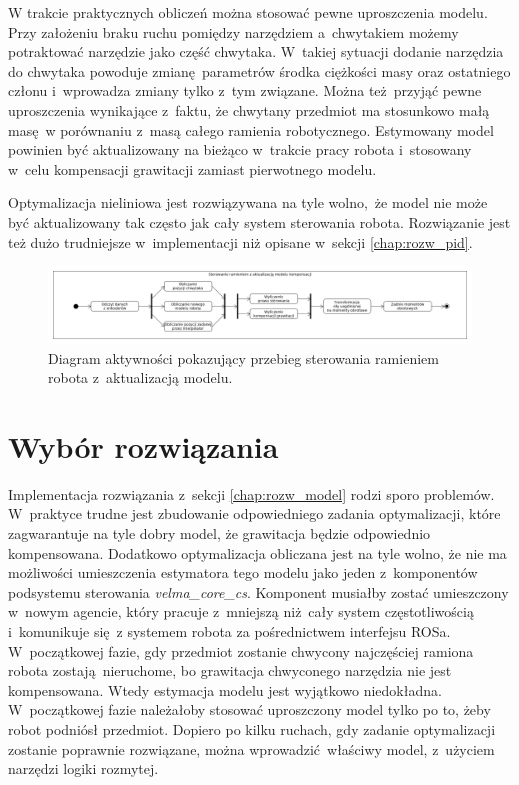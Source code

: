 W trakcie praktycznych obliczeń można stosować pewne uproszczenia modelu. Przy założeniu braku ruchu pomiędzy narzędziem a~chwytakiem możemy potraktować narzędzie jako część chwytaka. W~takiej sytuacji dodanie narzędzia do chwytaka powoduje zmianę parametrów środka ciężkości masy oraz ostatniego członu i~wprowadza zmiany tylko z~tym związane. Można też przyjąć pewne uproszczenia wynikające z~faktu, że chwytany przedmiot ma stosunkowo małą masę w porównaniu z~masą całego ramienia robotycznego. Estymowany model powinien być aktualizowany na bieżąco w~trakcie pracy robota i~stosowany w~celu kompensacji grawitacji zamiast pierwotnego modelu.

Optymalizacja nieliniowa jest rozwiązywana na tyle wolno, że model nie może być aktualizowany tak często jak cały system sterowania robota. Rozwiązanie jest też dużo trudniejsze w~implementacji niż opisane w~sekcji \ref{chap:rozw_pid}. 

\begin{figure}
	\centering
	\includegraphics[width=.99\textwidth]{images/komp_model.png}
	\caption{Diagram aktywności pokazujący przebieg sterowania ramieniem robota z~aktualizacją modelu.}
	\label{fig:kompensacja}
\end{figure}

\section{Wybór rozwiązania}

Implementacja rozwiązania z~sekcji \ref{chap:rozw_model} rodzi sporo problemów. W~praktyce trudne jest zbudowanie odpowiedniego zadania optymalizacji, które zagwarantuje na tyle dobry model, że grawitacja będzie odpowiednio kompensowana. Dodatkowo optymalizacja obliczana jest na tyle wolno, że nie ma możliwości umieszczenia estymatora tego modelu jako jeden z~komponentów podsystemu sterowania \textit{velma\_core\_cs}. Komponent musiałby zostać umieszczony w~nowym agencie, który pracuje z~mniejszą niż cały system częstotliwością i~komunikuje się z systemem robota za pośrednictwem interfejsu ROSa. W~początkowej fazie, gdy przedmiot zostanie chwycony najczęściej ramiona robota zostają nieruchome, bo grawitacja chwyconego narzędzia nie jest kompensowana. Wtedy estymacja modelu jest wyjątkowo niedokładna. W~początkowej fazie należałoby stosować uproszczony model tylko po to, żeby robot podniósł przedmiot. Dopiero po kilku ruchach, gdy zadanie optymalizacji zostanie poprawnie rozwiązane, można wprowadzić właściwy model, z~użyciem narzędzi logiki rozmytej.

